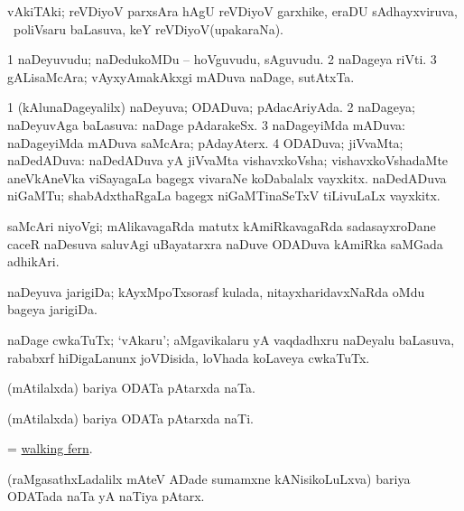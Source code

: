 \bentry
{} 
\gl{\nA}
\expl{}
\bmng
vAkiTAki; reVDiyoV parxsAra hAgU reVDiyoV garxhike, eraDU sAdhayxviruva, \sA\ poliVsaru baLasuva, keY reVDiyoV(upakaraNa). 
\emng
\eentry

\bentry
{} 
\gl{\nA}
\expl{}
\bmng
\bnum
\num{1} naDeyuvudu; naDedukoMDu -- hoVguvudu, sAguvudu. 
\num{2} naDageya riVti. 
\num{3} gALisaMcAra; vAyxyAmakAkxgi mADuva naDage, sutAtxTa. 
\enum
\emng
\eentry

\bentry
{} 
\gl{\gu}
\expl{}
\bmng
\bnum
\num{1} (kAlunaDageyalilx) naDeyuva; ODADuva; pAdacAriyAda. 
\num{2} naDageya; naDeyuvAga baLasuva:  naDage pAdarakeSx. 
\num{3} naDageyiMda mADuva:  naDageyiMda mADuva saMcAra; pAdayAterx. 
\num{4} ODADuva; jiVvaMta; naDedADuva:  naDedADuva yA jiVvaMta vishavxkoVsha; vishavxkoVshadaMte aneVkAneVka viSayagaLa bagegx vivaraNe koDabalalx vayxkitx.  naDedADuva niGaMTu; shabAdxthaRgaLa bagegx niGaMTinaSeTxV tiLivuLaLx vayxkitx. 
\enum
\emng
\eentry

\bentry
{} 
\gl{\nA}
\expl{}
\bmng
saMcAri niyoVgi; mAlikavagaRda matutx kAmiRkavagaRda sadasayxroDane caceR naDesuva saluvAgi uBayatarxra naDuve ODADuva kAmiRka saMGada adhikAri. 
\emng
\eentry

\bentry
{} 
\gl{\nA}
\expl{}
\bmng
naDeyuva jarigiDa; kAyxMpoTxsorasf kulada, nitayxharidavxNaRda oMdu bageya jarigiDa. 
\emng
\eentry

\bentry
{} 
\gl{\nA}
\expl{}
\bmng
naDage cwkaTuTx; `vAkaru'; aMgavikalaru yA vaqdadhxru naDeyalu baLasuva, rababxrf hiDigaLanunx joVDisida, loVhada koLaveya cwkaTuTx. 
\emng
\eentry

\bentry
{} 
\gl{\nA}
\expl{}
\bmng
(mAtilalxda) bariya ODATa pAtarxda naTa. 
\emng
\eentry

\bentry
{} 
\gl{\nA}
\expl{}
\bmng
(mAtilalxda) bariya ODATa pAtarxda naTi. 
\emng
\eentry

\bentry
{} 
\gl{\nA}
\expl{}
\bmng
= \hyperlink{walking fern}{walking fern}. 
\emng
\eentry

\bentry
{} 
\gl{\nA}
\expl{}
\bmng
(raMgasathxLadalilx mAteV ADade sumamxne kANisikoLuLxva) bariya ODATada naTa yA naTiya pAtarx. 
\emng
\eentry

